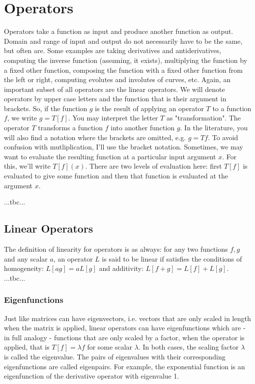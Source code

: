 \section{Operators}
Operators take a function as input and produce another function as output. Domain and range of input and output do not necessarily have to be the same, but often are. Some examples are taking derivatives and antiderivatives, computing the inverse function (assuming, it exists), multiplying the function by a fixed other function, composing the function with a fixed other function from the left or right, computing evolutes and involutes of curves, etc. Again, an important subset of all operators are the linear operators. We will denote operators by upper case letters and the function that is their argument in brackets. So, if the function $g$ is the result of applying an operator $T$ to a function $f$, we write $g = T[f]$. You may interpret the letter $T$ as "transformation". The operator $T$ transforms a function $f$ into another function $g$. In the literature, you will also find a notation where the brackets are omitted, e.g. $g = T f$. To avoid confusion with mutliplication, I'll use the bracket notation. Sometimes, we may want to evaluate the resulting function at a particular input argument $x$. For this, we'll write $T[f](x)$. There are two levels of evaluation here: first $T[f]$ is evaluated to give some function and then that function is evaluated at the argument $x$.

...tbc...



\subsection{Linear Operators}
The definition of linearity for operators is as always: for any two functions $f,g$ and any scalar $a$, an operator $L$ is said to be linear if satisfies the conditions of homogeneity: $L[a g] = a L[g]$ and additivity: $L[f+g] = L[f] + L[g]$. ...tbc...


\subsubsection{Eigenfunctions}
Just like matrices can have eigenvectors, i.e. vectors that are only scaled in length when the matrix is applied, linear operators can have eigenfunctions which are - in full analogy - functions that are only scaled by a factor, when the operator is applied, that is $T[f] = \lambda f$ for some scalar $\lambda$. In both cases, the scaling factor $\lambda$ is called the eigenvalue. The pairs of eigenvalues with their corresponding eigenfunctions are called eigenpairs. For example, the exponential function is an eigenfunction of the derivative operator with eigenvalue 1.


